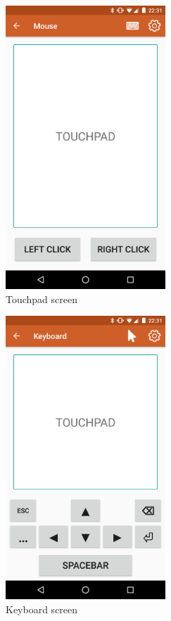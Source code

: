 \documentclass{sig-alternate}
\renewcommand\_{\textunderscore\allowbreak}  %
\begin{document}
\begin{figure}[ht]
	\hypertarget{fig:touchpad}{}
	\centering
	\caption{Touchpad screen}
	\includegraphics[width=6cm]{screenshots/touchpad}
\end{figure}

\begin{figure}[ht]
	\hypertarget{fig:keyboard}{}
	\centering
	\caption{Keyboard screen}
	\includegraphics[width=6cm]{screenshots/keyboard}
\end{figure}
\end{document}
